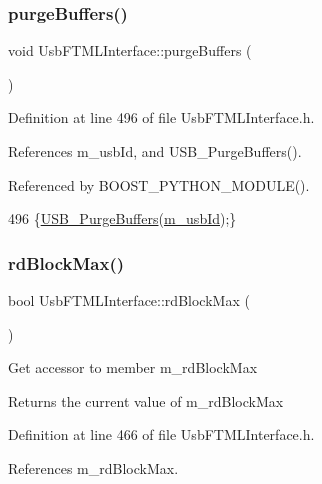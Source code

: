 \subsubsection{\texorpdfstring{purge\+Buffers()}{purgeBuffers()}}
{\footnotesize\ttfamily void Usb\+F\+T\+M\+L\+Interface\+::purge\+Buffers (\begin{DoxyParamCaption}{ }\end{DoxyParamCaption})\hspace{0.3cm}{\ttfamily [inline]}}



Definition at line 496 of file Usb\+F\+T\+M\+L\+Interface.\+h.



References m\+\_\+usb\+Id, and U\+S\+B\+\_\+\+Purge\+Buffers().



Referenced by B\+O\+O\+S\+T\+\_\+\+P\+Y\+T\+H\+O\+N\+\_\+\+M\+O\+D\+U\+L\+E().


\begin{DoxyCode}
496 \{\hyperlink{LALUsbML_8h_ab28cf26b80d470d84681e4da8a38afd7}{USB\_PurgeBuffers}(\hyperlink{classUsbFTMLInterface_aab6754587c303660d5c498ce34a2b4c8}{m\_usbId});\}
\end{DoxyCode}
\mbox{\label{classUsbFTMLInterface_ac0a393da12305baa111deb699f7190cb}} 
\subsubsection{\texorpdfstring{rd\+Block\+Max()}{rdBlockMax()}}
{\footnotesize\ttfamily bool Usb\+F\+T\+M\+L\+Interface\+::rd\+Block\+Max (\begin{DoxyParamCaption}{ }\end{DoxyParamCaption})\hspace{0.3cm}{\ttfamily [inline]}}

Get accessor to member m\+\_\+rd\+Block\+Max \begin{DoxyReturn}{Returns}
the current value of m\+\_\+rd\+Block\+Max 
\end{DoxyReturn}


Definition at line 466 of file Usb\+F\+T\+M\+L\+Interface.\+h.



References m\+\_\+rd\+Block\+Max.



